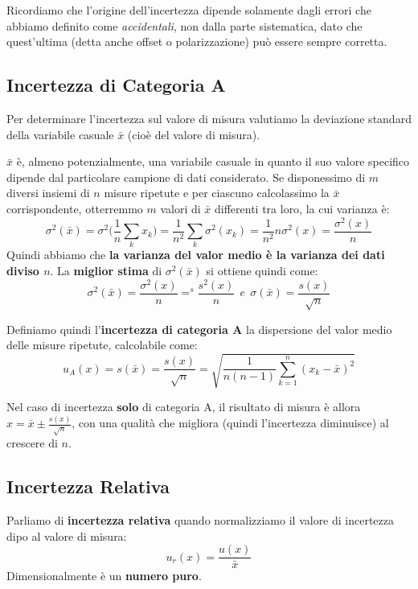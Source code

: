 \documentclass[a4paper,11pt]{report}
\begin{document}
Ricordiamo che l'origine dell'incertezza dipende solamente dagli errori che abbiamo definito come \textit{accidentali}, non dalla parte sistematica, dato che quest'ultima (detta anche offset o polarizzazione) può essere sempre corretta.

\subsection{Incertezza di Categoria A}
Per determinare l'incertezza sul valore di misura valutiamo la deviazione standard della variabile casuale $\bar{x}$ (cioè del valore di misura).

$\bar{x}$ è, almeno potenzialmente, una variabile casuale in quanto il suo valore specifico dipende dal particolare campione di dati considerato. Se disponessimo di $m$ diversi insiemi di $n$ misure ripetute e per ciascuno calcolassimo la $\bar{x}$ corrispondente, otterremmo $m$ valori di $\bar{x}$ differenti tra loro, la cui varianza è:
$$
  \sigma^2(\bar{x}) = \sigma^2\Bigg(\frac{1}{n}\sum_kx_k\Bigg) = 
  \frac{1}{n^2}\sum_k\sigma^2(x_k) = \frac{1}{n^2}n\sigma^2(x) =
  \frac{\sigma^2(x)}{n}
$$
Quindi abbiamo che \textbf{la varianza del valor medio è la varianza dei dati diviso $n$}.
La \textbf{miglior stima} di $\sigma^2(\bar{x})$ si ottiene quindi come\footnotemark[1] :
$$
  \sigma^2(\bar{x}) = \frac{\sigma^2(x)}{n} =^s \frac{s^2(x)}{n}\ \ e\ \ \sigma(\bar{x}) = \frac{s(x)}{\sqrt{n}}
$$

Definiamo quindi l'\textbf{incertezza di categoria A} la dispersione del valor medio delle misure ripetute, calcolabile come:
\begin{equation}
  \label{inc.cat.A}
    u_A(x) = s(\bar{x}) = \frac{s(x)}{\sqrt{n}} = \sqrt{\frac{1}{n(n-1)}\sum^n_{k=1}(x_k-\bar{x})^2}
\end{equation}

Nel caso di incertezza \textbf{solo} di categoria A, il risultato di misura è allora $x = \bar{x} \pm \frac{s(x)}{\sqrt{n}}$, con una qualità che migliora (quindi l'incertezza diminuisce) al crescere di $n$.
\subsection{Incertezza Relativa}
Parliamo di \textbf{incertezza relativa} quando normalizziamo il valore di incertezza dipo al valore di misura:
$$
  u_r(x) = \frac{u(x)}{\bar{x}}
$$
Dimensionalmente è un \textbf{numero puro}.
\end{document}

